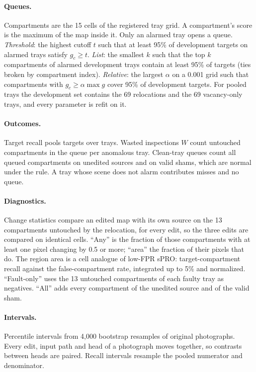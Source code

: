 \paragraph{Queues.} Compartments are the 15 cells of the registered tray grid. A compartment's score is the maximum of the map inside it. Only an alarmed tray opens a queue. \emph{Threshold}: the highest cutoff $t$ such that at least 95\% of development targets on alarmed trays satisfy $g_c\ge t$. \emph{List}: the smallest $k$ such that the top $k$ compartments of alarmed development trays contain at least 95\% of targets (ties broken by compartment index). \emph{Relative}: the largest $\alpha$ on a 0.001 grid such that compartments with $g_c\ge\alpha\max g$ cover 95\% of development targets. For pooled trays the development set contains the 69 relocations and the 69 vacancy-only trays, and every parameter is refit on it.
\paragraph{Outcomes.} Target recall pools targets over trays. Wasted inspections $W$ count untouched compartments in the queue per anomalous tray. Clean-tray queues count all queued compartments on unedited sources and on valid shams, which are normal under the rule. A tray whose scene does not alarm contributes misses and no queue.
\paragraph{Diagnostics.} Change statistics compare an edited map with its own source on the 13 compartments untouched by the relocation, for every edit, so the three edits are compared on identical cells. ``Any'' is the fraction of those compartments with at least one pixel changing by 0.5 or more; ``area'' the fraction of their pixels that do. The region area is a cell analogue of low-FPR sPRO: target-compartment recall against the false-compartment rate, integrated up to 5\% and normalized. ``Fault-only'' uses the 13 untouched compartments of each faulty tray as negatives. ``All'' adds every compartment of the unedited source and of the valid sham.
\paragraph{Intervals.} Percentile intervals from 4{,}000 bootstrap resamples of original photographs. Every edit, input path and head of a photograph moves together, so contrasts between heads are paired. Recall intervals resample the pooled numerator and denominator.

